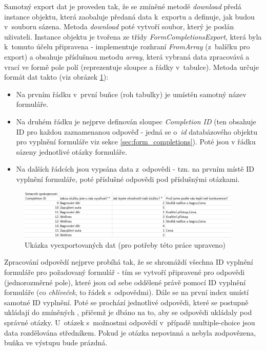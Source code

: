 			Samotný export dat je proveden tak, že se zmíněné metodě \textit{download} předá instance objektu, která zaobaluje předaná data k~exportu a definuje, jak budou v~souboru sázena. Metoda \textit{download} poté vytvoří soubor, který je poslán uživateli. Instance objektu je tvořena ze třídy \textit{FormCompletionsExport}, která byla k~tomuto účelu připravena - implementuje rozhraní \textit{FromArray} (z~balíčku pro export) a obsahuje příslušnou metodu \textit{array}, která vybraná data zpracovává a vrací ve formě pole polí (reprezentuje sloupce a řádky v~tabulce). Metoda určuje formát dat takto (viz obrázek \ref{fig:export_excel}):
			
			\begin{itemize}
				\item Na prvním řádku v~první buňce (roh tabulky) je umístěn samotný název formuláře.
				\item Na druhém řádku je nejprve definován sloupec \textit{Completion ID} (ten obsahuje ID pro každou zaznamenanou odpověď - jedná se o~\textit{id} databázového objektu pro vyplnění formuláře viz sekce \ref{sec:form_completions}). Poté jsou v řádku sázeny jednotlivé otázky formuláře.
				\item Na dalších řádcích jsou vypsána data z~odpovědi - tzn. na prvním místě ID vyplnění formuláře, poté příslušné odpovědi pod příslušnými otázkami.
			\end{itemize}
		
			\begin{figure}[h]
				\centering
				\includegraphics[width=0.95\textwidth]{img/export_excel.png}
				\caption{Ukázka vyexportovaných dat (pro potřeby této práce upraveno)}
				\label{fig:export_excel}
			\end{figure}
		
			Zpracování odpovědí nejprve probíhá tak, že se shromáždí všechna ID vyplnění formuláře pro požadovaný formulář - tím se vytvoří připravené  pro odpovědi (jednorozměrné pole), které jsou od sebe oddělené právě pomocí ID vyplnění formuláře (co \textit{chlíveček}, to řádek s~odpovědmi). Dále se na první index  umístí samotné ID vyplnění. Poté se prochází jednotlivé odpovědi, které se postupně ukládají do zmíněných , přičemž je dbáno na to, aby se odpovědi ukládaly pod správné otázky. U~otázek s~možnostmi odpovědí v~případě multiple-choice jsou data rozdělována středníkem. Pokud je otázka nepovinná a nebyla zodpovězena, buňka ve výstupu bude prázdná. 
			
